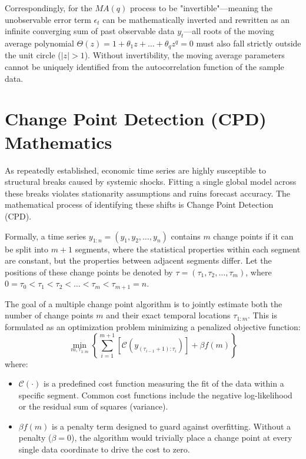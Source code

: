 \documentclass[11pt, a4paper]{report}
\begin{document}
Correspondingly, for the $MA(q)$ process to be "invertible"—meaning the unobservable error term $\epsilon_t$ can be mathematically inverted and rewritten as an infinite converging sum of past observable data $y_t$—all roots of the moving average polynomial $\Theta(z) = 1 + \theta_1 z + \dots + \theta_q z^q = 0$ must also fall strictly outside the unit circle ($|z| > 1$). Without invertibility, the moving average parameters cannot be uniquely identified from the autocorrelation function of the sample data.


\section{Change Point Detection (CPD) Mathematics}
As repeatedly established, economic time series are highly susceptible to structural breaks caused by systemic shocks. Fitting a single global model across these breaks violates stationarity assumptions and ruins forecast accuracy. The mathematical process of identifying these shifts is Change Point Detection (CPD).

Formally, a time series $y_{1:n} = (y_1, y_2, \dots, y_n)$ contains $m$ change points if it can be split into $m+1$ segments, where the statistical properties within each segment are constant, but the properties between adjacent segments differ. Let the positions of these change points be denoted by $\tau = (\tau_1, \tau_2, \dots, \tau_m)$, where $0 = \tau_0 < \tau_1 < \tau_2 < \dots < \tau_m < \tau_{m+1} = n$.

The goal of a multiple change point algorithm is to jointly estimate both the number of change points $m$ and their exact temporal locations $\tau_{1:m}$. This is formulated as an optimization problem minimizing a penalized objective function:
\begin{equation}
    \min_{m, \tau_{1:m}} \left\{ \sum_{i=1}^{m+1} \left[ \mathcal{C}(y_{(\tau_{i-1}+1):\tau_i}) \right] + \beta f(m) \right\}
\end{equation}
where:
\begin{itemize}
    \item $\mathcal{C}(\cdot)$ is a predefined cost function measuring the fit of the data within a specific segment. Common cost functions include the negative log-likelihood or the residual sum of squares (variance).
    \item $\beta f(m)$ is a penalty term designed to guard against overfitting. Without a penalty ($\beta = 0$), the algorithm would trivially place a change point at every single data coordinate to drive the cost to zero. 
\end{itemize}
\end{document}
